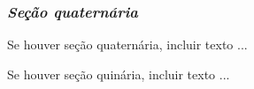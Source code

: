 \documentclass[
        english,			
        brazil			        %
        ,<...>]{abntbibufjf}
\begin{document}
\subsubsection{\textit{Se\c{c}\~ao quatern\'aria}} %

Se houver se\c{c}\~ao quatern\'aria, incluir texto ...


Se houver se\c{c}\~ao quin\'aria, incluir texto ...




 
\end{document}

